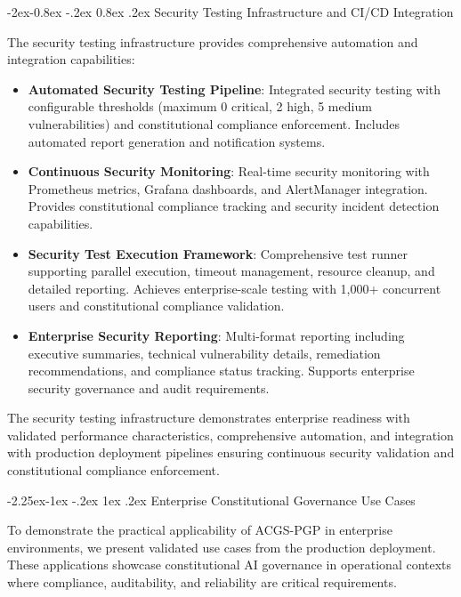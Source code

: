 \documentclass[manuscript,screen,9pt]{acmart}
\makeatletter
\renewcommand\subsection{\@startsection{subsection}{2}{\z@}%
  {-2.25ex\@plus -1ex \@minus -.2ex}%
  {1ex \@plus .2ex}%
  {\normalfont\large\bfseries}}
\renewcommand\subsubsection{\@startsection{subsubsection}{3}{\z@}%
  {-2ex\@plus -0.8ex \@minus -.2ex}%
  {0.8ex \@plus .2ex}%
  {\normalfont\normalsize\bfseries}}
\makeatother
\begin{document}
\subsubsection{Security Testing Infrastructure and CI/CD Integration}
\label{subsubsec:security_infrastructure}

The security testing infrastructure provides comprehensive automation and integration capabilities:

\begin{itemize}[leftmargin=*,itemsep=2pt,parsep=1pt]
    \item \textbf{Automated Security Testing Pipeline}: Integrated security testing with configurable thresholds (maximum 0 critical, 2 high, 5 medium vulnerabilities) and constitutional compliance enforcement. Includes automated report generation and notification systems.

    \item \textbf{Continuous Security Monitoring}: Real-time security monitoring with Prometheus metrics, Grafana dashboards, and AlertManager integration. Provides constitutional compliance tracking and security incident detection capabilities.

    \item \textbf{Security Test Execution Framework}: Comprehensive test runner supporting parallel execution, timeout management, resource cleanup, and detailed reporting. Achieves enterprise-scale testing with 1,000+ concurrent users and constitutional compliance validation.

    \item \textbf{Enterprise Security Reporting}: Multi-format reporting including executive summaries, technical vulnerability details, remediation recommendations, and compliance status tracking. Supports enterprise security governance and audit requirements.
\end{itemize}

The security testing infrastructure demonstrates enterprise readiness with validated performance characteristics, comprehensive automation, and integration with production deployment pipelines ensuring continuous security validation and constitutional compliance enforcement.

\subsection{Enterprise Constitutional Governance Use Cases}
\label{subsec:enterprise_use_cases}

To demonstrate the practical applicability of ACGS-PGP in enterprise environments, we present validated use cases from the production deployment. These applications showcase constitutional AI governance in operational contexts where compliance, auditability, and reliability are critical requirements.
\end{document}

